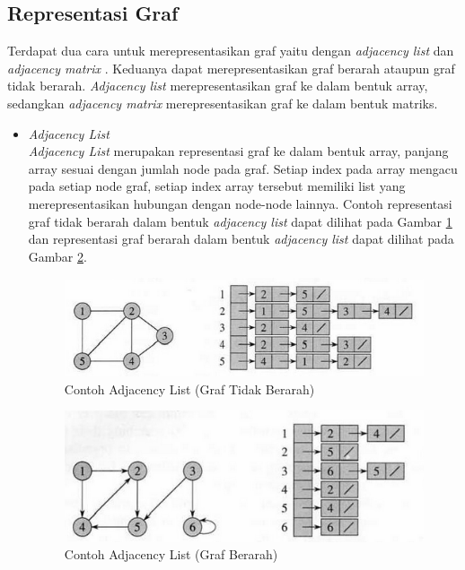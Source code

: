 \subsection{Representasi Graf}
Terdapat dua cara untuk merepresentasikan graf yaitu dengan \textit{adjacency
list} dan \textit{adjacency matrix} \cite{Cormen:2001}. Keduanya dapat
merepresentasikan graf berarah ataupun graf tidak berarah. \textit{Adjacency list} merepresentasikan
graf ke dalam bentuk array, sedangkan \textit{adjacency matrix}
merepresentasikan graf ke dalam bentuk matriks.
\begin{itemize}
  \item \textit{Adjacency List}\\
  \textit{Adjacency List} merupakan representasi graf ke dalam bentuk array,
  panjang array sesuai dengan jumlah node pada graf. Setiap index pada array
  mengacu pada setiap node graf, setiap index array tersebut memiliki list yang
  merepresentasikan hubungan dengan node-node lainnya. Contoh representasi graf
  tidak berarah dalam bentuk \textit{adjacency list} dapat dilihat pada Gambar 
  \ref{fig:adjlist_undirec} dan representasi graf berarah
  dalam bentuk \textit{adjacency list} dapat dilihat pada Gambar
  \ref{fig:adjlist_direc}.
  
\begin{figure}[h]
\centering
\includegraphics[scale=0.8]{Gambar/adjlist_undirec}
\caption[Contoh Adjacency List]{Contoh Adjacency List (Graf Tidak Berarah)}
\label{fig:adjlist_undirec}
\end{figure}

\begin{figure}[h]
\centering
\includegraphics[scale=1]{Gambar/adjlist_direc}
\caption[Contoh Adjacency List]{Contoh Adjacency List (Graf Berarah)}
\label{fig:adjlist_direc}
\end{figure}
  

\end{itemize}

